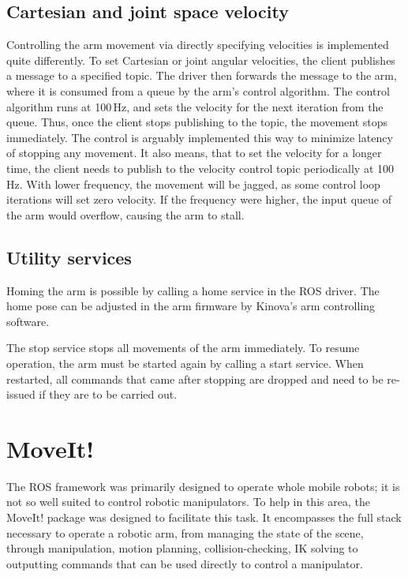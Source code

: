 \documentclass[buriama8_dp.tex]{subfiles}
\begin{document}
\subsection{Cartesian and joint space velocity}
\label{subsec:api_cart_vel}

Controlling the arm movement via directly specifying velocities is implemented quite differently. To set Cartesian or joint angular velocities, the client publishes a message to a specified topic. The driver then forwards the message to the arm, where it is consumed from a queue by the arm's control algorithm. The control algorithm runs at 100\,Hz, and sets the velocity for the next iteration from the queue. Thus, once the client stops publishing to the topic, the movement stops immediately. The control is arguably implemented this way to minimize latency of stopping any movement. It also means, that to set the velocity for a longer time, the client needs to publish to the velocity control topic periodically at 100\,Hz. With lower frequency, the movement will be jagged, as some control loop iterations will set zero velocity. If the frequency were higher, the input queue of the arm would overflow, causing the arm to stall.

\subsection{Utility services}
\label{subsec:api_util}

Homing the arm is possible by calling a home service in the ROS driver. The home pose can be adjusted in the arm firmware by Kinova's arm controlling software.

The stop service stops all movements of the arm immediately. To resume operation, the arm must be started again by calling a start service. When restarted, all commands that came after stopping are dropped and need to be re-issued if they are to be carried out.

\section{MoveIt!}
\label{sec:moveit}

The ROS framework was primarily designed to operate whole mobile robots; it is not so well suited to control robotic manipulators. To help in this area, the MoveIt! package was designed to facilitate this task. It encompasses the full stack necessary to operate a robotic arm, from managing the state of the scene, through manipulation, motion planning, collision-checking, IK solving to outputting commands that can be used directly to control a manipulator.
\end{document}
